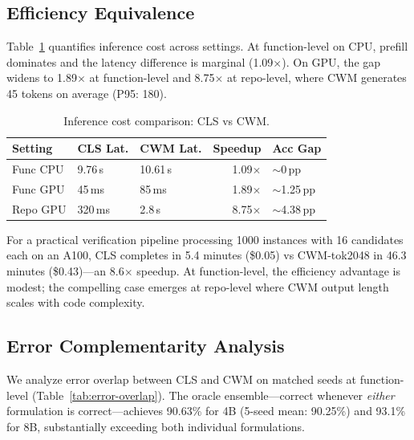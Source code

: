 \documentclass[11pt,a4paper]{article}
\begin{document}
\subsection{Efficiency Equivalence}
\label{sec:efficiency}

Table~\ref{tab:efficiency} quantifies inference cost across settings.
At function-level on CPU, prefill dominates and the latency difference is marginal (1.09$\times$).
On GPU, the gap widens to 1.89$\times$ at function-level and 8.75$\times$ at repo-level, where CWM generates 45 tokens on average (P95: 180).

\begin{table}[t]
\centering
\small
\begin{tabular}{lllrl}
\toprule
\textbf{Setting} & \textbf{CLS Lat.} & \textbf{CWM Lat.} & \textbf{Speedup} & \textbf{Acc Gap} \\
\midrule
Func CPU & 9.76\,s & 10.61\,s & 1.09$\times$ & $\sim$0\,pp \\
Func GPU & 45\,ms & 85\,ms & 1.89$\times$ & $\sim$1.25\,pp \\
Repo GPU & 320\,ms & 2.8\,s & 8.75$\times$ & $\sim$4.38\,pp \\
\bottomrule
\end{tabular}
\caption{Inference cost comparison: CLS vs CWM.}
\label{tab:efficiency}
\end{table}

For a practical verification pipeline processing 1000 instances with 16 candidates each on an A100, CLS completes in 5.4 minutes (\$0.05) vs CWM-tok2048 in 46.3 minutes (\$0.43)---an 8.6$\times$ speedup.
At function-level, the efficiency advantage is modest; the compelling case emerges at repo-level where CWM output length scales with code complexity.

\subsection{Error Complementarity Analysis}
\label{sec:complementarity}

We analyze error overlap between CLS and CWM on matched seeds at function-level (Table~\ref{tab:error-overlap}).
The oracle ensemble---correct whenever \emph{either} formulation is correct---achieves 90.63\% for 4B (5-seed mean: 90.25\%) and 93.1\% for 8B, substantially exceeding both individual formulations.
\end{document}

